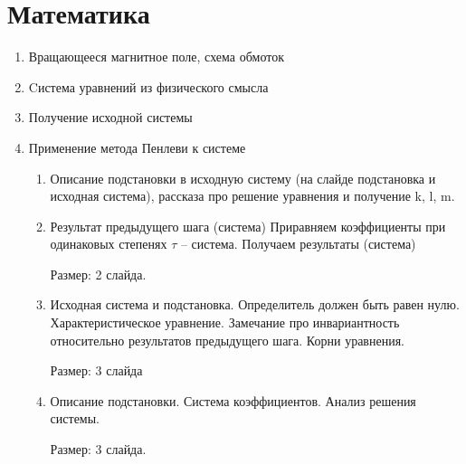 \section{Математика}

\begin{enumerate}

\item{Вращающееся магнитное поле, схема обмоток}

\item{Cистема уравнений из физического смысла}

\item{Получение исходной системы}

\item{Применение метода Пенлеви к системе}

  \begin{enumerate}
    
    \item
      Описание подстановки в исходную систему (на слайде подстановка и исходная система), рассказа про решение уравнения и получение k, l, m.

    \item
      Результат предыдущего шага (система)
      Приравняем коэффициенты при одинаковых степенях $ \tau $ -- система.
      Получаем результаты (система)

      Размер: 2 слайда.
      
    \item
      Исходная система и подстановка.
      Определитель должен быть равен нулю.
      Характеристическое уравнение. Замечание про инвариантность относительно результатов предыдущего шага.
      Корни уравнения.
      
      Размер: 3 слайда
      
    \item
      Описание подстановки. 
      Система коэффициентов.
      Анализ решения системы.
      
      Размер: 3 слайда.

  \end{enumerate}



\end{enumerate}
